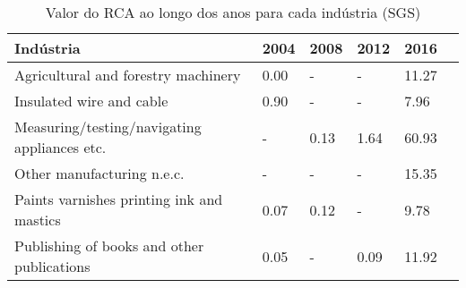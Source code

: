 \begin{table}
\centering
\caption{Valor do RCA ao longo dos anos para cada indústria (SGS)}
\begin{tabular}{p{6cm}p{1.5cm}p{1.5cm}p{1.5cm}p{1.5cm}p{1.5cm}}
\toprule
                                   Indústria & 2004 & 2008 & 2012 &  2016 \\
\midrule
         Agricultural and forestry machinery & 0.00 &    - &    - & 11.27 \\
                    Insulated wire and cable & 0.90 &    - &    - &  7.96 \\
Measuring/testing/navigating appliances etc. &    - & 0.13 & 1.64 & 60.93 \\
                  Other manufacturing n.e.c. &    - &    - &    - & 15.35 \\
   Paints varnishes printing ink and mastics & 0.07 & 0.12 &    - &  9.78 \\
  Publishing of books and other publications & 0.05 &    - & 0.09 & 11.92 \\
\bottomrule
\end{tabular}
\end{table}
